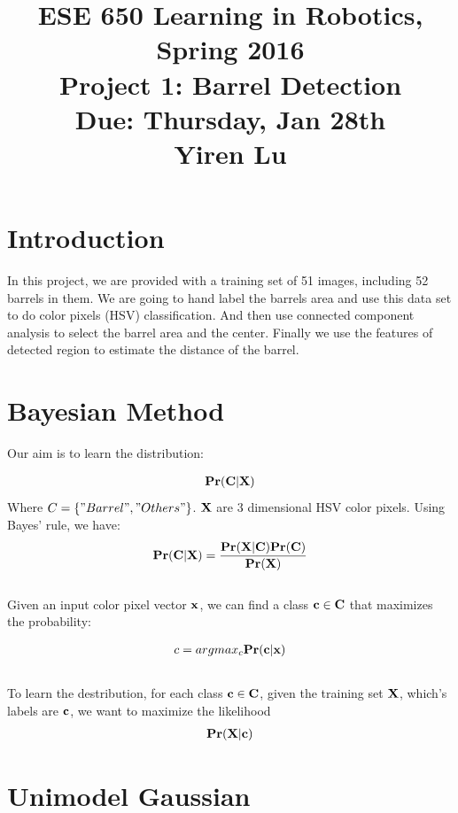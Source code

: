 \documentclass[english]{article}
\title{ESE 650 Learning in Robotics, Spring 2016 \\ Project 1: Barrel Detection\\
Due: Thursday, Jan 28th \\ Yiren Lu}
\date{}
\begin{document}
\maketitle
\vspace{-30pt}

\section*{Introduction}

In this project, we are provided with a training set of 51 images, including 52 barrels in them. We are going to hand label the barrels area and use this data set to do color pixels (HSV) classification. And then use connected component analysis to select the barrel area and the center. Finally we use the features of detected region to estimate the distance of the barrel.



\section {Bayesian Method}

Our aim is to learn the distribution:

\begin{align*}
\bf{Pr}(C|\bf{X})
\end{align*}
Where $C = \{"Barrel", "Others"\}$. $\bf{X}$ are 3 dimensional HSV color pixels. Using Bayes' rule, we have: 
\begin{align*}
\bf{Pr}(C|\bf{X}) = \frac{Pr(\bf{X}|C) Pr(C)}{Pr(\bf{X})}
\end{align*}
\\
Given an input color pixel vector $\bf{x}$, we can find a class $\bf{c} \in C$ that maximizes the probability:

\begin{align*}
c = argmax_c \bf{Pr}(\bf{c}|\bf{x})
\end{align*}
\\
To learn the destribution, for each class $\bf{c} \in \bf{C}$, given the training set $\bf{X}$, which's labels are $\bf{c}$, we want to maximize the likelihood
\begin{align*}
\bf{Pr}(\bf{X}|\bf{c})
\end{align*}

\section {Unimodel Gaussian} 
\end{document}
